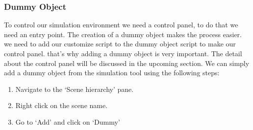 \subsubsection{Dummy Object}
To control our simulation environment we need a control panel, to do that we need an entry point. The creation of a dummy object makes the process easier. we need to add our customize script to the dummy object script to make our control panel. that's why adding a dummy object is very important. The detail about the control panel will be discussed in the upcoming section.
We can simply add a dummy object from the simulation tool using the following steps: 

\begin{enumerate}
  \item  Navigate to the ‘Scene hierarchy’ pane.
  \item  Right click on the scene name.
  \item Go to ‘Add’ and click on ‘Dummy’
\end{enumerate}



